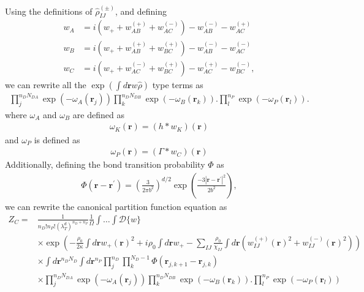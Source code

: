 \documentclass{article}
\begin{document}
Using the definitions of $\hat{\rho}_{IJ}^{(\pm)}$, and defining
\begin{align*}
  w_A &=
    i \left( w_+ + w_{AB}^{(+)} + w_{AC}^{(-)} \right)
    - w_{AB}^{(-)} - w_{AC}^{(+)} \\
  w_B &=
    i \left( w_+ + w_{AB}^{(+)} + w_{BC}^{(+)} \right)
    - w_{AB}^{(-)} - w_{AC}^{(-)} \\
  w_C &=
    i \left( w_+ + w_{AC}^{(-)} + w_{BC}^{(+)} \right)
    - w_{AC}^{(+)} - w_{BC}^{(-)},
\end{align*}
  we can rewrite all the $\exp(\int d \mathbf{r} w\hat{\rho})$ type terms as
\begin{align*}
  \prod_{j}^{n_{D}N_{DA}}
  \exp \left( -\omega_A(\mathbf{r}_j) \right)
  \prod_{k}^{n_{D}N_{DB}}
  \exp \left( -\omega_B(\mathbf{r}_k) \right).
  \prod_{l}^{n_P}
  \exp \left( -\omega_P(\mathbf{r}_l) \right).
\end{align*}
where $\omega_A$ and $\omega_B$ are defined as
\begin{align*}
  \omega_K(\mathbf{r}) = (h \ast w_K)(\mathbf{r})
\end{align*}
and $\omega_P$ is defined as
\begin{align*}
  \omega_P(\mathbf{r}) = (\Gamma \ast w_C)(\mathbf{r})
\end{align*}
Additionally, defining the bond transition probability $\Phi$ as
\begin{align*}
  \Phi(\mathbf{r} - \mathbf{r}^\prime) =
    \left( \frac{3}{2\pi b^2} \right) ^ {d/2}
    \exp \left( \frac{-3| \mathbf{r} - \mathbf{r}^\prime |^2}{2b^2} \right),
\end{align*}
we can rewrite the canonical partition function equation as
\begin{align*}
  Z_C =& \frac{1}{n_D!n_P! \left( \lambda_T^d \right)^{n_D+n_P}}
    \frac{1}{\Omega}
    \int \hdots \int \mathcal{D} \{w\} \\
    &\times
    \exp \left(
      - \frac{\rho_0}{2\kappa} \int d \mathbf{r} w_+(\mathbf{r})^2
      + i \rho_0 \int d\mathbf{r} w_+
      - \sum_{IJ}
      \frac{\rho_0}{\chi_{IJ}}
      \int d \mathbf{r}
      \left(
        w_{IJ}^{(+)} (\mathbf{r})^2 + w_{IJ}^{(-)} (\mathbf{r})^2
      \right)
    \right) \\
    &\times \int d \mathbf{r}^{n_DN_D} \int d \mathbf{r}^{n_P}
      \prod_j^{n_D} \prod_k^{N_D-1}
      \Phi(\mathbf{r}_{j,k+1} - \mathbf{r}_{j,k}) \\
    &\times
    \prod_{j}^{n_{D}N_{DA}} \exp \left( -\omega_A(\mathbf{r}_j) \right)
    \prod_{k}^{n_{D}N_{DB}} \exp \left( -\omega_B(\mathbf{r}_k) \right).
    \prod_{l}^{n_P}         \exp \left( -\omega_P(\mathbf{r}_l) \right)
\end{align*}
\end{document}
